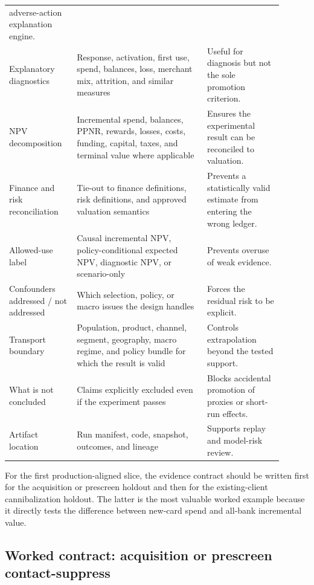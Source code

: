 \documentclass[11pt]{article}
\newcommand{\1}{\mathbf{1}}
\begin{document}
\begin{longtable}{L{0.22\linewidth}L{0.43\linewidth}L{0.25\linewidth}}
    adverse-action explanation engine. \\
Explanatory diagnostics
  & Response, activation, first use, spend, balances, loss, merchant mix,
    attrition, and similar measures
  & Useful for diagnosis but not the sole promotion criterion. \\
NPV decomposition
  & Incremental spend, balances, PPNR, rewards, losses, costs, funding,
    capital, taxes, and terminal value where applicable
  & Ensures the experimental result can be reconciled to valuation. \\
Finance and risk reconciliation
  & Tie-out to finance definitions, risk definitions, and approved valuation
    semantics
  & Prevents a statistically valid estimate from entering the wrong ledger. \\
Allowed-use label
  & Causal incremental NPV, policy-conditional expected NPV, diagnostic NPV,
    or scenario-only
  & Prevents overuse of weak evidence. \\
Confounders addressed / not addressed
  & Which selection, policy, or macro issues the design handles
  & Forces the residual risk to be explicit. \\
Transport boundary
  & Population, product, channel, segment, geography, macro regime, and policy
    bundle for which the result is valid
  & Controls extrapolation beyond the tested support. \\
What is not concluded
  & Claims explicitly excluded even if the experiment passes
  & Blocks accidental promotion of proxies or short-run effects. \\
Artifact location
  & Run manifest, code, snapshot, outcomes, and lineage
  & Supports replay and model-risk review. \\
\bottomrule
\end{longtable}

For the first production-aligned slice, the evidence contract should be
written first for the acquisition or prescreen holdout and then for the
existing-client cannibalization holdout. The latter is the most valuable
worked example because it directly tests the difference between new-card
spend and all-bank incremental value.

\subsection{Worked contract: acquisition or prescreen contact-suppress}
\label{subsec:worked-acquisition-contract}
\end{document}
